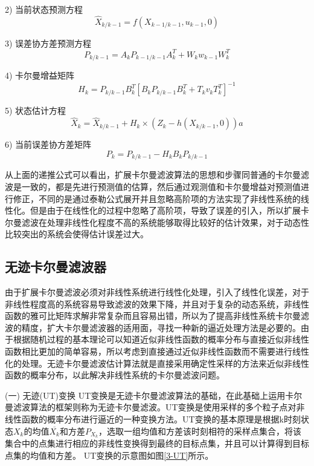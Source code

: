 2) 当前状态预测方程
\begin{equation}
{{\widehat{X}}_{k/k-1}}=f\left( {{X}_{k-1/k-1}},{{u}_{k-1}},0 \right)
\end{equation}

3) 误差协方差预测方程
\begin{equation}
{{P}_{k/k-1}}={{A}_{k}}{{P}_{k-1/k-1}}A_{k}^{T}+{{W}_{k}}{{w}_{k-1}}W_{k}^{T}
\end{equation}  

4) 卡尔曼增益矩阵
\begin{equation}
{{H}_{k}}={{P}_{k/k-1}}B_{k}^{T}{{[{{B}_{k}}{{P}_{k/k-1}}B_{k}^{T}+{{T}_{k}}{{v}_{k}}T_{k}^{T}]}^{-1}}
\end{equation}  
	  
5) 状态估计方程
\begin{equation}
{{\widehat{X}}_{k}}={{\widehat{X}}_{k/k-1}}+{{H}_{k}}\times \left( {{Z}_{k}}-h\left( {{X}_{k/k-1}},0 \right) \right)a
\end{equation}  
	  
6) 当前误差协方差矩阵
\begin{equation}
{{P}_{k}}={{P}_{k/k-1}}-{{H}_{k}}{{B}_{k}}{{P}_{k/k-1}}
\end{equation}  

从上面的递推公式可以看出，扩展卡尔曼滤波算法的思想和步骤同普通的卡尔曼滤波是一致的，都是先进行预测值的估算，然后通过观测值和卡尔曼增益对预测值进行修正，不同的是通过泰勒公式展开并且忽略高阶项的方法实现了非线性系统的线性化。但是由于在线性化的过程中忽略了高阶项，导致了误差的引入，所以扩展卡尔曼滤波在处理非线性化程度不高的系统能够取得比较好的估计效果，对于动态性比较突出的系统会使得估计误差过大。
\subsection{无迹卡尔曼滤波器}
由于扩展卡尔曼滤波必须对非线性系统进行线性化处理，引入了线性化误差，对于非线性程度高的系统容易导致滤波的效果下降，并且对于复杂的动态系统，非线性函数的雅可比矩阵求解非常复杂而且容易出错，所以为了提高非线性系统卡尔曼滤波的精度，扩大卡尔曼滤波器的适用面，寻找一种新的逼近处理方法是必要的。由于根据随机过程的基本理论可以知道近似非线性函数的概率分布与直接近似非线性函数相比更加的简单容易，所以考虑到直接通过近似非线性函数而不需要进行线性化的处理。无迹卡尔曼滤波估计算法就是直接采用确定性采样的方法来近似非线性函数的概率分布，以此解决非线性系统的卡尔曼滤波问题。

(一)	无迹(UT)变换
	UT变换是无迹卡尔曼滤波算法的基础，在此基础上运用卡尔曼滤波算法的框架则称为无迹卡尔曼滤波。UT变换是使用采样的多个粒子点对非线性函数的概率分布进行逼近的一种变换方法。UT变换的基本原理是根据k时刻状态${{X}_{k}}$的均值$\overline{{{X}_{k}}}$和方差${{P}_{{{X}_{k}}}}$，选取一组均值和方差该时刻相符的采样点集合，将该集合中的点集进行相应的非线性变换得到最终的目标点集，并且可以计算得到目标点集的均值和方差。 UT变换的示意图如图\ref{3-UT}所示。

